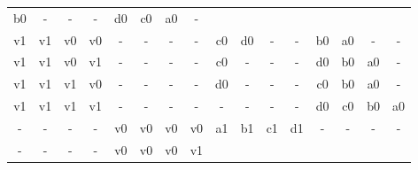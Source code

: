 \begin{table}[H]
{\begin{minipage}{\textwidth}
\begin{tabular}{cccccccccccccccc}
		\multicolumn{1}{|c}{b0} & \multicolumn{1}{c}{-} & \multicolumn{1}{c}{-}& \multicolumn{1}{c}{-} &
		\multicolumn{1}{c}{d0} &
		\multicolumn{1}{c}{c0} &
		\multicolumn{1}{c}{a0}&
		\multicolumn{1}{c}{-} \\
		\multicolumn{1}{c}{v1} & \multicolumn{1}{c}{v1} & \multicolumn{1}{c}{v0} & \multicolumn{1}{c}{v0} &
		\multicolumn{1}{c}{-} & \multicolumn{1}{c}{-} & \multicolumn{1}{c}{-} & \multicolumn{1}{c}{-} &
		\multicolumn{1}{|c}{c0} & \multicolumn{1}{c}{d0} & \multicolumn{1}{c}{-}& \multicolumn{1}{c}{-} &
		\multicolumn{1}{c}{b0} &
		\multicolumn{1}{c}{a0} &
		\multicolumn{1}{c}{-}&
		\multicolumn{1}{c}{-} \\
		\multicolumn{1}{c}{v1} & \multicolumn{1}{c}{v1} & \multicolumn{1}{c}{v0} & \multicolumn{1}{c}{v1} &
		\multicolumn{1}{c}{-} & \multicolumn{1}{c}{-} & \multicolumn{1}{c}{-} & \multicolumn{1}{c}{-} &
		\multicolumn{1}{|c}{c0} & \multicolumn{1}{c}{-} & \multicolumn{1}{c}{-}& \multicolumn{1}{c}{-} &
		\multicolumn{1}{c}{d0} &
		\multicolumn{1}{c}{b0} &
		\multicolumn{1}{c}{a0}&
		\multicolumn{1}{c}{-} \\
		\multicolumn{1}{c}{v1} & \multicolumn{1}{c}{v1} & \multicolumn{1}{c}{v1} & \multicolumn{1}{c}{v0} &
		\multicolumn{1}{c}{-} & \multicolumn{1}{c}{-} & \multicolumn{1}{c}{-} & \multicolumn{1}{c}{-} &
		\multicolumn{1}{|c}{d0} & \multicolumn{1}{c}{-} & \multicolumn{1}{c}{-}& \multicolumn{1}{c}{-} &
		\multicolumn{1}{c}{c0} &
		\multicolumn{1}{c}{b0} &
		\multicolumn{1}{c}{a0}&
		\multicolumn{1}{c}{-} \\
		\multicolumn{1}{c}{v1} & \multicolumn{1}{c}{v1} & \multicolumn{1}{c}{v1} & \multicolumn{1}{c}{v1} &
		\multicolumn{1}{c}{-} & \multicolumn{1}{c}{-} & \multicolumn{1}{c}{-} & \multicolumn{1}{c}{-} &
		\multicolumn{1}{|c}{-} & \multicolumn{1}{c}{-} & \multicolumn{1}{c}{-}& \multicolumn{1}{c}{-} &
		\multicolumn{1}{c}{d0} &
		\multicolumn{1}{c}{c0} &
		\multicolumn{1}{c}{b0}&
		\multicolumn{1}{c}{a0} \\			
		\multicolumn{1}{c}{-} & \multicolumn{1}{c}{-} & \multicolumn{1}{c}{-} & \multicolumn{1}{c}{-} &
		\multicolumn{1}{c}{v0} & \multicolumn{1}{c}{v0} & \multicolumn{1}{c}{v0} & \multicolumn{1}{c}{v0} &
		\multicolumn{1}{|c}{a1} & \multicolumn{1}{c}{b1} & \multicolumn{1}{c}{c1}& \multicolumn{1}{c}{d1} &
		\multicolumn{1}{c}{-} &
		\multicolumn{1}{c}{-} &
		\multicolumn{1}{c}{-}&
		\multicolumn{1}{c}{-} \\
		\multicolumn{1}{c}{-} & \multicolumn{1}{c}{-} & \multicolumn{1}{c}{-} & \multicolumn{1}{c}{-} &
		\multicolumn{1}{c}{v0} & \multicolumn{1}{c}{v0} & \multicolumn{1}{c}{v0} & \multicolumn{1}{c}{v1} &

\end{tabular}
\end{minipage}}
\end{table}
